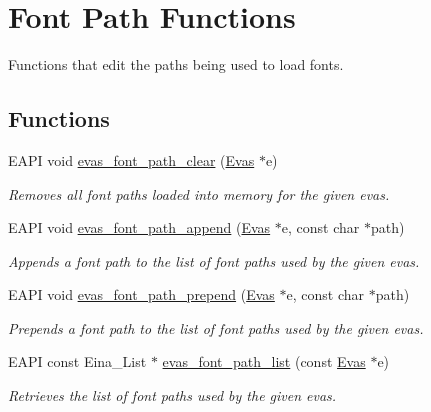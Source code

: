 \section{Font Path Functions}
\label{group__Evas__Font__Path__Group}


Functions that edit the paths being used to load fonts.  


\subsection*{Functions}
\begin{DoxyCompactItemize}
\item 
EAPI void \hyperlink{group__Evas__Font__Path__Group_gad565539bda0fc124e4a0865fa29a8463}{evas\_\-font\_\-path\_\-clear} (\hyperlink{group__Evas__Canvas_ga5ff87cc4ce6bc43e3b640a6d37f73043}{Evas} $\ast$e)
\begin{DoxyCompactList}\small\item\em Removes all font paths loaded into memory for the given evas. \item\end{DoxyCompactList}\item 
EAPI void \hyperlink{group__Evas__Font__Path__Group_ga0ec22ec047841db059a9f6f0b2ec5918}{evas\_\-font\_\-path\_\-append} (\hyperlink{group__Evas__Canvas_ga5ff87cc4ce6bc43e3b640a6d37f73043}{Evas} $\ast$e, const char $\ast$path)
\begin{DoxyCompactList}\small\item\em Appends a font path to the list of font paths used by the given evas. \item\end{DoxyCompactList}\item 
EAPI void \hyperlink{group__Evas__Font__Path__Group_ga652be59a6b8a2e7ecb71bef3ac31885b}{evas\_\-font\_\-path\_\-prepend} (\hyperlink{group__Evas__Canvas_ga5ff87cc4ce6bc43e3b640a6d37f73043}{Evas} $\ast$e, const char $\ast$path)
\begin{DoxyCompactList}\small\item\em Prepends a font path to the list of font paths used by the given evas. \item\end{DoxyCompactList}\item 
EAPI const Eina\_\-List $\ast$ \hyperlink{group__Evas__Font__Path__Group_ga06fc80b3e4c27237a571404fc6aa3aeb}{evas\_\-font\_\-path\_\-list} (const \hyperlink{group__Evas__Canvas_ga5ff87cc4ce6bc43e3b640a6d37f73043}{Evas} $\ast$e)
\begin{DoxyCompactList}\small\item\em Retrieves the list of font paths used by the given evas. \item\end{DoxyCompactList}\end{DoxyCompactItemize}


